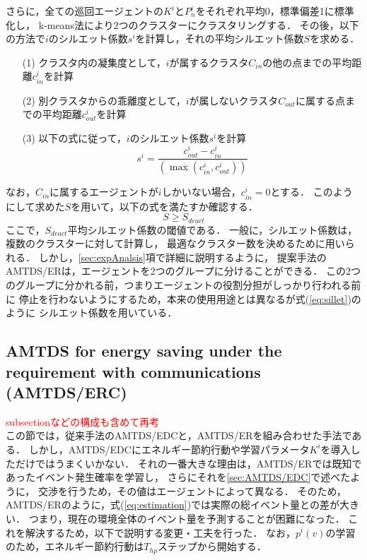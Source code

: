 \documentclass[12pt,a4j,twoside]{jarticle}
\def\red#1{\textcolor{red}{#1}}
\begin{document}
  さらに，全ての巡回エージェントの$K^i$と$P^i_n$をそれぞれ平均0，標準偏差1に標準化し，
  k-means法により2つのクラスターにクラスタリングする．
  その後，以下の方法で$i$のシルエット係数$s^i$を計算し，それの平均シルエット係数$S$を求める．
  \begin{enumerate}
    \item[(1)] クラスタ内の凝集度として，$i$が属するクラスタ$C_{in}$の他の点までの平均距離$c^i_{in}$を計算
    \item[(2)] 別クラスタからの乖離度として，$i$が属しないクラスタ$C_{out}$に属する点までの平均距離$c^i_{out}$を計算
    \item[(3)] 以下の式に従って，$i$のシルエット係数$s^i$を計算
                \begin{equation}
                  s^i = \dfrac{c^i_{out} - c^i_{in}}{(\max(c^i_{in}, c^i_{out}))}
                \end{equation}
  \end{enumerate}
  なお，$C_{in}$に属するエージェントが$i$しかいない場合，$c^i_{in} = 0$とする．
  このようにして求めた$S$を用いて，以下の式を満たすか確認する．
    \begin{equation}\label{eq:sillet}
      S \geq S_{deact}
    \end{equation}
  ここで，$S_{deact}$平均シルエット係数の閾値である．
  一般に，シルエット係数は，複数のクラスターに対して計算し，
  最適なクラスター数を決めるために用いられる．
  しかし，\ref{sec:expAnalsis}項で詳細に説明するように，
  提案手法のAMTDS/ERは，エージェントを2つのグループに分けることができる．
  この2つのグループに分かれる前，つまりエージェントの役割分担がしっかり行われる前に
  停止を行わないようにするため，本来の使用用途とは異なるが式(\ref{eq:sillet})のように
  シルエット係数を用いている．
 
  \subsection{AMTDS for energy saving under the requirement with communications (AMTDS/ERC)}
  \red{subsectionなどの構成も含めて再考}\\
  この節では，従来手法のAMTDS/EDCと，AMTDS/ERを組み合わせた手法である．
  しかし，AMTDS/EDCにエネルギー節約行動や学習パラメータ$K^i$を導入しただけではうまくいかない．
  それの一番大きな理由は，AMTDS/ERでは既知であったイベント発生確率を学習し，
  さらにそれを\ref{sec:AMTDS/EDC}で述べたように，
  交渉を行うため，その値はエージェントによって異なる．
  そのため，AMTDS/ERのように，式(\ref{eq:estimation})では実際の総イベント量との差が大きい．
  つまり，現在の環境全体のイベント量を予測することが困難になった．
  これを解決するため，以下で説明する変更・工夫を行った．
  なお，$p^i(v)$の学習のため，エネルギー節約行動は$T_{hp}$ステップから開始する．
  
\end{document}
